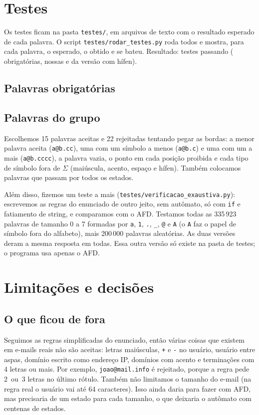 \documentclass[11pt,a4paper]{article}
\newcommand{\s}[1]{\texttt{#1}}
\begin{document}
\section{Testes}

Os testes ficam na pasta \s{testes/}, em arquivos de texto com o resultado esperado de cada palavra. O script
\s{testes/rodar\_testes.py} roda todos e mostra, para cada palavra, o esperado, o obtido e se bateu.
Resultado: \TestesTotal{} testes passando (\TestesObrigTotal{} obrigatórias, \TestesPropriasTotal{} nossas
e \TestesHifenTotal{} da versão com hífen).

\subsection*{Palavras obrigatórias}
\begin{center}\footnotesize\TestesObrig\end{center}

\subsection*{Palavras do grupo}
Escolhemos 15 palavras aceitas e 22 rejeitadas tentando pegar as bordas: a menor palavra aceita
(\s{a@b.cc}), uma com um símbolo a menos (\s{a@b.c}) e uma com um a mais (\s{a@b.cccc}), a palavra vazia, o
ponto em cada posição proibida e cada tipo de símbolo fora de $\Sigma$ (maiúscula, acento, espaço e hífen).
Também colocamos palavras que passam por todos os estados.
\begin{center}\footnotesize\TestesProprias\end{center}

Além disso, fizemos um teste a mais (\s{testes/verificacao\_exaustiva.py}): escrevemos as regras do enunciado
de outro jeito, sem autômato, só com \s{if} e fatiamento de string, e comparamos com o AFD. Testamos todas as
335\,923 palavras de tamanho 0 a 7 formadas por \s{a}, \s{1}, \s{.}, \s{\_}, \s{@} e \s{A} (o \s{A} faz o papel
de símbolo fora do alfabeto), mais 200\,000 palavras aleatórias. As duas versões deram a mesma resposta em
todas. Essa outra versão só existe na pasta de testes; o programa usa apenas o AFD.

\section{Limitações e decisões}

\subsection{O que ficou de fora}
Seguimos as regras simplificadas do enunciado, então várias coisas que existem em e-mails reais não são aceitas:
letras maiúsculas, \s{+} e \s{-} no usuário, usuário entre aspas, domínio escrito como endereço IP,
domínios com acento e terminações com 4 letras ou mais. Por exemplo, \s{joao@mail.info} é rejeitado, porque a regra pede
2~ou~3 letras no último rótulo. Também não limitamos o tamanho do e-mail (na regra real o usuário vai
até 64 caracteres). Isso ainda daria para fazer com AFD, mas precisaria de um estado para cada tamanho, o que
deixaria o autômato com centenas de estados.
\end{document}
